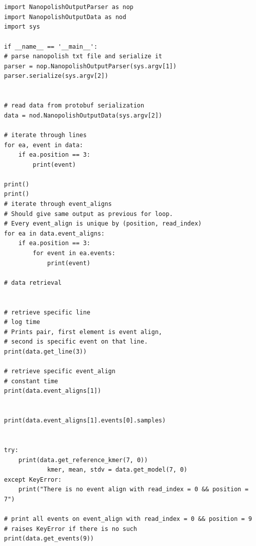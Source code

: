 \documentclass[times, utf, seminar]{fer}
\begin{document}
\begin{lstlisting}


import NanopolishOutputParser as nop
import NanopolishOutputData as nod
import sys

if __name__ == '__main__':
# parse nanopolish txt file and serialize it
parser = nop.NanopolishOutputParser(sys.argv[1])
parser.serialize(sys.argv[2])


# read data from protobuf serialization
data = nod.NanopolishOutputData(sys.argv[2])

# iterate through lines
for ea, event in data:
	if ea.position == 3:
		print(event)

print()
print()
# iterate through event_aligns
# Should give same output as previous for loop.
# Every event_align is unique by (position, read_index)
for ea in data.event_aligns:
	if ea.position == 3:
		for event in ea.events:
			print(event)

# data retrieval


# retrieve specific line
# log time
# Prints pair, first element is event align,
# second is specific event on that line.
print(data.get_line(3))

# retrieve specific event_align
# constant time
print(data.event_aligns[1])


print(data.event_aligns[1].events[0].samples)


try:
	print(data.get_reference_kmer(7, 0))
			kmer, mean, stdv = data.get_model(7, 0)
except KeyError:
	print("There is no event align with read_index = 0 && position = 7")

# print all events on event_align with read_index = 0 && position = 9
# raises KeyError if there is no such
print(data.get_events(9))
\end{lstlisting}
\newpage







\end{document}
